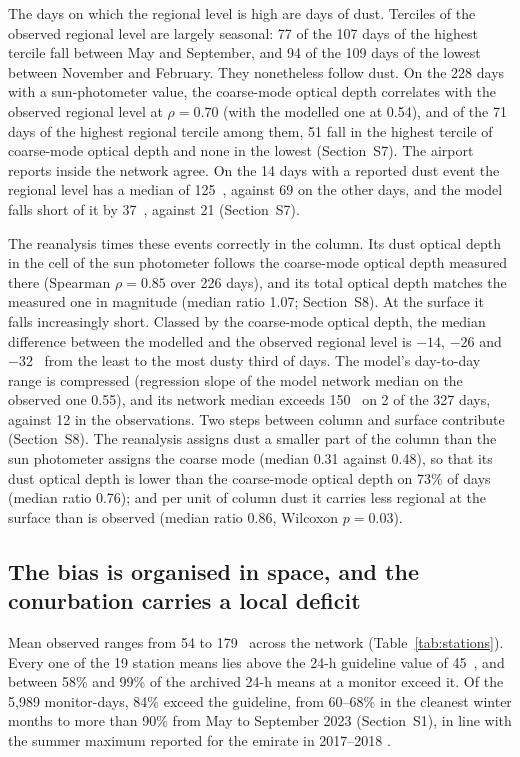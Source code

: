 The days on which the regional level is high are days of dust. Terciles of the observed regional
level are largely seasonal: 77 of the 107 days of the highest tercile fall between May and
September, and 94 of the 109 days of the lowest between November and February. They nonetheless
follow dust. On the 228 days with a sun-photometer value, the coarse-mode optical depth correlates
with the observed regional level at $\rho=0.70$ (with the modelled one at 0.54), and of the 71 days
of the highest regional tercile among them, 51 fall in the highest tercile of coarse-mode optical
depth and none in the lowest (Section~S7). The airport reports inside the network agree. On the
14 days with a reported dust event the regional level has a median of 125~\ugm{}, against 69 on
the other days, and the model falls short of it by 37~\ugm{}, against 21 (Section~S7).

The reanalysis times these events correctly in the column. Its dust optical depth in the cell of
the sun photometer follows the coarse-mode optical depth measured there (Spearman $\rho=0.85$ over
226 days), and its total optical depth matches the measured one in magnitude (median ratio 1.07;
Section~S8). At the surface it falls increasingly short. Classed by the coarse-mode optical depth,
the median difference between the modelled and the observed regional level is $-14$, $-26$ and
$-32$~\ugm{} from the least to the most dusty third of days. The model's day-to-day range is
compressed (regression slope of the model network median on the observed one 0.55), and its network
median exceeds 150~\ugm{} on 2 of the 327 days, against 12 in the observations. Two steps between
column and surface contribute (Section~S8). The reanalysis assigns dust a smaller part of the
column than the sun photometer assigns the coarse mode (median 0.31 against 0.48), so that its dust
optical depth is lower than the coarse-mode optical depth on 73\% of days (median ratio 0.76); and
per unit of column dust it carries less regional \pmten{} at the surface than is observed (median
ratio 0.86, Wilcoxon $p=0.03$).

\subsection{The bias is organised in space, and the conurbation carries a local deficit}
\label{sec:res-bias}

Mean observed \pmten{} ranges from 54 to 179~\ugm{} across the network
(Table~\ref{tab:stations}). Every one of the 19 station means lies above the 24-h guideline value
of 45~\ugm{}, and between 58\% and 99\% of the archived 24-h means at a monitor exceed it. Of the
5,989 monitor-days, 84\% exceed the guideline, from 60--68\% in the cleanest winter months to
more than 90\% from May to September 2023 (Section~S1), in line with the summer maximum reported
for the emirate in 2017--2018 \citep{abuelgasim2020}.


